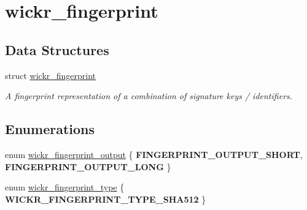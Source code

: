 \hypertarget{group__wickr__fingerprint}{}\section{wickr\+\_\+fingerprint}
\label{group__wickr__fingerprint}
\subsection*{Data Structures}
\begin{DoxyCompactItemize}
\item 
struct \mbox{\hyperlink{structwickr__fingerprint}{wickr\+\_\+fingerprint}}
\begin{DoxyCompactList}\small\item\em A fingerprint representation of a combination of signature keys / identifiers. \end{DoxyCompactList}\end{DoxyCompactItemize}
\subsection*{Enumerations}
\begin{DoxyCompactItemize}
\item 
enum \mbox{\hyperlink{group__wickr__fingerprint_gafaac3f13daae0b97e91f3fb744f4c9e2}{wickr\+\_\+fingerprint\+\_\+output}} \{ {\bfseries F\+I\+N\+G\+E\+R\+P\+R\+I\+N\+T\+\_\+\+O\+U\+T\+P\+U\+T\+\_\+\+S\+H\+O\+RT}, 
{\bfseries F\+I\+N\+G\+E\+R\+P\+R\+I\+N\+T\+\_\+\+O\+U\+T\+P\+U\+T\+\_\+\+L\+O\+NG}
 \}
\item 
enum \mbox{\hyperlink{group__wickr__fingerprint_ga09d6f8936a6d1fbacb13c643c2e81810}{wickr\+\_\+fingerprint\+\_\+type}} \{ {\bfseries W\+I\+C\+K\+R\+\_\+\+F\+I\+N\+G\+E\+R\+P\+R\+I\+N\+T\+\_\+\+T\+Y\+P\+E\+\_\+\+S\+H\+A512}
 \}
\end{DoxyCompactItemize}

